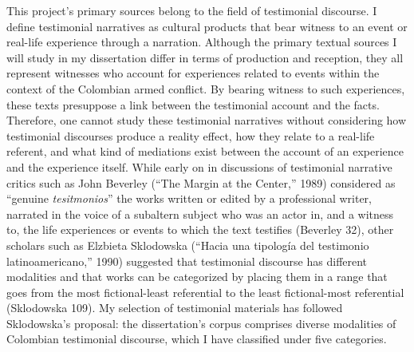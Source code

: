 \documentclass[
  11pt,
,
onecolumn,
openany
]{book}
\begin{document}
This project's primary sources belong to the field of testimonial discourse. I
define testimonial narratives as cultural products that bear witness to an
event or real-life experience through a narration. Although the primary
textual sources I will study in my dissertation differ in terms of production
and reception, they all represent witnesses who account for experiences
related to events within the context of the Colombian armed conflict. By
bearing witness to such experiences, these texts presuppose a link between the
testimonial account and the facts. Therefore, one cannot study these
testimonial narratives without considering how testimonial discourses produce
a reality effect, how they relate to a real-life referent, and what kind of
mediations exist between the account of an experience and the experience
itself. While early on in discussions of testimonial narrative critics such as
John Beverley (``The Margin at the Center,'' 1989) considered as ``genuine
\emph{tesitmonios}'' the works written or edited by a professional writer,
narrated in the voice of a subaltern subject who was an actor in, and a
witness to, the life experiences or events to which the text testifies
(Beverley 32), other scholars such as Elzbieta Sklodowska (``Hacia una
tipología del testimonio latinoamericano,'' 1990) suggested that testimonial
discourse has different modalities and that works can be categorized by
placing them in a range that goes from the most fictional-least referential to
the least fictional-most referential (Sklodowska 109). My selection of
testimonial materials has followed Sklodowska's proposal: the dissertation's
corpus comprises diverse modalities of Colombian testimonial discourse, which
I have classified under five categories.
\end{document}
